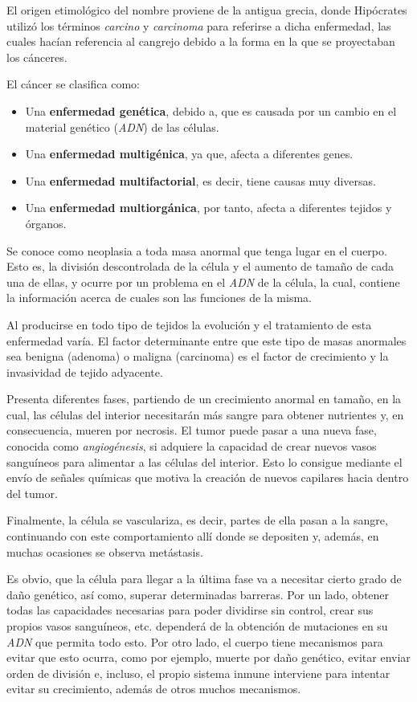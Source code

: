 El origen etimológico del nombre proviene de la antigua grecia, donde
Hipócrates utilizó los términos \textit{carcino} y \textit{carcinoma} para referirse
a dicha enfermedad, las cuales hacían referencia al cangrejo debido a la forma en la
que se proyectaban los cánceres.

El cáncer se clasifica como:

\begin{itemize}
    \item Una \textbf{enfermedad genética}, debido a, que es causada por un cambio en el
    material genético (\textit{ADN}) de las células.
    \item Una \textbf{enfermedad multigénica}, ya que, afecta a diferentes genes.
    \item Una \textbf{enfermedad multifactorial}, es decir, tiene causas muy diversas.
    \item Una \textbf{enfermedad multiorgánica}, por tanto, afecta a diferentes tejidos y órganos.
\end{itemize}

Se conoce como neoplasia a toda masa anormal que tenga lugar en el cuerpo. Esto es, la división
descontrolada de la célula y el aumento de tamaño de cada una de ellas, y ocurre
por un problema en el \textit{ADN} de la célula, la cual, contiene la información acerca de cuales son
las funciones de la misma.

Al producirse en todo tipo de tejidos la evolución y el tratamiento de esta enfermedad varía.
El factor determinante entre que este tipo de masas anormales sea benigna (adenoma)
o maligna (carcinoma) es el factor de crecimiento y la invasividad de tejido adyacente.

Presenta diferentes fases, partiendo de un crecimiento anormal en tamaño, en la cual,
las células del interior necesitarán más sangre para obtener nutrientes y, en consecuencia,
mueren por necrosis. El tumor puede pasar a una nueva fase, conocida como \textit{angiogénesis},
si adquiere la capacidad de crear nuevos vasos sanguíneos para alimentar a las células
del interior. Esto lo consigue mediante el envío de señales químicas que motiva la creación
de nuevos capilares hacia dentro del tumor.

Finalmente, la célula se vasculariza, es decir, partes de ella pasan
a la sangre, continuando con este comportamiento allí donde se depositen y, además, en muchas
ocasiones se observa metástasis.

Es obvio, que la célula para llegar a la última fase va a necesitar cierto grado de daño genético,
así como, superar determinadas barreras. Por un lado, obtener todas las capacidades necesarias para
poder dividirse sin control, crear sus propios vasos sanguíneos, etc. dependerá de la obtención
de mutaciones en su \textit{ADN} que permita todo esto. Por otro lado, el cuerpo tiene mecanismos para evitar
que esto ocurra, como por ejemplo, muerte por daño genético, evitar enviar orden de división e, incluso,
el propio sistema inmune interviene para intentar evitar su crecimiento, además de otros muchos mecanismos.

